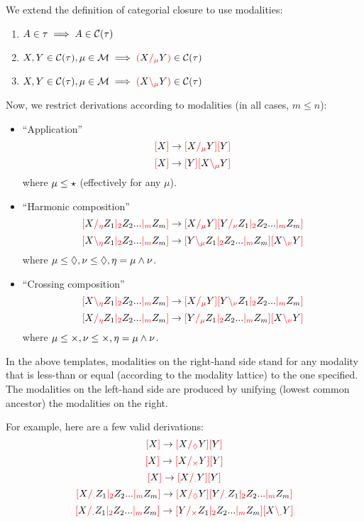 \documentclass[main.tex]{subfiles}
\begin{document}
\begin{defn}
    We extend the definition of categorial closure to use modalities:
    \begin{enumerate}
        \item \label{cmod:atomic} $A \in \tau \implies A \in \cclos{\tau}$
        \item \label{cmod:right}  $X, Y \in \cclos{\tau}, \mu \in \mathcal{M} \implies \lp X \rci{\mu} Y \rp \in \cclos{\tau}$
        \item \label{cmod:left}   $X, Y \in \cclos{\tau}, \mu \in \mathcal{M} \implies \lp X \lci{\mu} Y \rp \in \cclos{\tau}$
    \end{enumerate}
\end{defn}

Now, we restrict derivations according to modalities (in all cases, $m \leq n$):
\begin{itemize}
    \item ``Application''
        \[ \lb X \rb \gderiv \lb X \rci{\mu} Y \rb \lb Y \rb \]
        \[ \lb X \rb \gderiv \lb Y \rb \lb X \lci{\mu} Y \rb \]
        where $\mu \less \modstar$ (effectively for any $\mu$).
    \item ``Harmonic composition''
        \[ \lb X \rci{\eta} Z_1 \mci{2} Z_2 ... \mci{m} Z_m \rb \gderiv \lb X \rci{\mu} Y \rb \lb Y \rci{\nu} Z_1 \mci{2} Z_2 ... \mci{m} Z_m \rb \]
        \[ \lb X \lci{\eta} Z_1 \mci{2} Z_2 ... \mci{m} Z_m \rb \gderiv \lb Y \lci{\mu} Z_1 \mci{2} Z_2 ... \mci{m} Z_m \rb \lb X \lci{\nu} Y \rb \]
        where $\mu \less \modr, \nu \less \modr, \eta = \mu \meet \nu$.
    \item ``Crossing composition''
        \[ \lb X \lci{\eta} Z_1 \mci{2} Z_2 ... \mci{m} Z_m \rb \gderiv \lb X \rci{\mu} Y \rb \lb Y \lci{\nu} Z_1 \mci{2} Z_2 ... \mci{m} Z_m \rb \]
        \[ \lb X \rci{\eta} Z_1 \mci{2} Z_2 ... \mci{m} Z_m \rb \gderiv \lb Y \rci{\mu} Z_1 \mci{2} Z_2 ... \mci{m} Z_m \rb \lb X \lci{\nu} Y \rb \]
        where $\mu \less \modx, \nu \less \modx, \eta = \mu \meet \nu$.
\end{itemize}

In the above templates, modalities on the right-hand side stand for any
modality that is less-than or equal (according to the modality lattice)
to the one specified. The modalities on the left-hand side are produced by
unifying (lowest common ancestor) the modalities on the right.

\begin{example}
    For example, here are a few valid derivations:
    \[ \lb X \rb \gderiv \lb X \rci{\modr} Y \rb \lb Y \rb \]
    \[ \lb X \rb \gderiv \lb X \rci{\modx} Y \rb \lb Y \rb \]
    \[ \lb X \rb \gderiv \lb X \rci{\moddot} Y \rb \lb Y \rb \]
    \[ \lb X \rci{\moddot} Z_1 \mci{2} Z_2 ... \mci{m} Z_m \rb \gderiv \lb X \rci{\modr} Y \rb \lb Y \rci{\moddot} Z_1 \mci{2} Z_2 ... \mci{m} Z_m \rb \]
    \[ \lb X \rci{\moddot} Z_1 \mci{2} Z_2 ... \mci{m} Z_m \rb \gderiv \lb Y \rci{\modx} Z_1 \mci{2} Z_2 ... \mci{m} Z_m \rb \lb X \lci{\moddot} Y \rb \]
\end{example}
\end{document}

